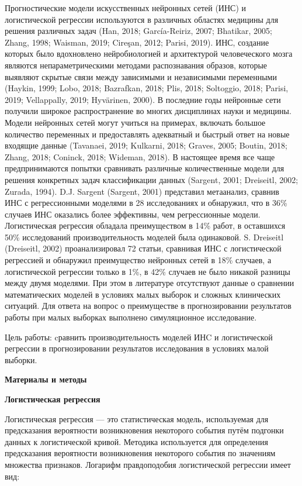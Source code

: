 \documentclass[a4paper,twoside]{article}
\newcommand{\header}[1]{\bigskip\medskip\noindent\textbf{#1}\nopagebreak\bigskip}
\theoremstyle{theorem}
\theoremstyle{remark}
\begin{document}
Прогностические модели искусственных нейронных сетей (ИНС) и логистической регрессии используются в различных областях медицины для решения различных задач (Han, 2018; García-Reiriz, 2007; Bhatikar, 2005; Zhang, 1998; Waisman, 2019; Cireşan, 2012; Parisi, 2019). ИНС, создание которых было вдохновлено нейробиологией и архитектурой человеческого мозга являются непараметрическими методами распознавания образов, которые выявляют скрытые связи между зависимыми и независимыми переменными (Haykin, 1999; Lobo, 2018; Bazrafkan, 2018; Plis, 2018; Soltoggio, 2018; Parisi, 2019; Vellappally, 2019; Hyvärinen, 2000). В последние годы нейронные сети получили широкое распространение во многих дисциплинах науки и медицины. Модели нейронных сетей могут учиться на примерах, включать большое количество переменных и предоставлять адекватный и быстрый ответ на новые входящие данные (Tavanaei, 2019; Kulkarni, 2018; Graves, 2005; Boutin, 2018; Zhang, 2018; Coninck, 2018; Wideman, 2018). В настоящее время все чаще предпринимаются попытки сравнивать различные количественные модели для решения конкретных задач классификации данных (Sargent, 2001; Dreiseitl, 2002; Zurada, 1994). D.J. Sargent (Sargent, 2001) представил метаанализ, сравнив ИНС с регрессионными моделями в 28 исследованиях и обнаружил, что в 36\% случаев ИНС оказались более эффективны, чем регрессионные модели. Логистическая регрессия обладала преимуществом в 14\% работ, в оставшихся 50\% исследований производительность моделей была одинаковой. S. Dreiseitl (Dreiseitl, 2002) проанализировал 72 статьи, сравнивая ИНС с логистической регрессией и обнаружил преимущество нейронных сетей в 18\% случаев, а логистической регрессии только в 1\%, в 42\% случаев не было никакой разницы между двумя моделями. При этом в литературе отсутствуют данные о сравнении математических моделей в условиях малых выборок и сложных клинических ситуаций. Для ответа на вопрос о преимуществе в прогнозировании результатов работы при малых выборках выполнено симуляционное исследование.

Цель работы: cравнить производительность моделей ИНC и логистической регрессии в прогнозировании результатов исследования в условиях малой выборки.

\header{Материалы и методы}

\textbf{Логистическая регрессия}

Логистическая регрессия — это статистическая модель, используемая для предсказания вероятности возникновения некоторого события путём подгонки данных к логистической кривой. Методика используется для определения предсказания вероятности возникновения некоторого события по значениям множества признаков.
Логарифм правдоподобия логистической регрессии имеет вид:
\end{document}
